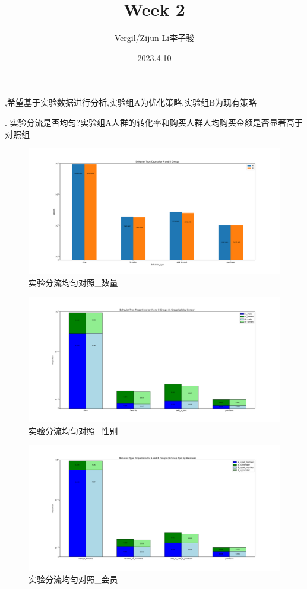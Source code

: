 \documentclass[a4paper]{article}
\author{Vergil/Zijun Li李子骏}
\title{Week 2}
\date{2023.4.10}
\begin{document}
\maketitle
{},希望基于实验数据进行分析,实验组A为优化策略,实验组B为现有策略

.	实验分流是否均匀?实验组A人群的转化率和购买人群人均购买金额是否显著高于对照组

\begin{figure}[H]
    \centering
    \includegraphics[width=1\textwidth]{./AB_Count.pdf}
    \caption{实验分流均匀对照\_数量}
    \label{fig:experiment1}
\end{figure}

\begin{figure}[H]
	\centering
	\includegraphics[width=1\textwidth]{./AB_Gender.pdf}
	\caption{实验分流均匀对照\_性别}
	\label{fig:2}
\end{figure}

\begin{figure}[H]
	\centering
	\includegraphics[width=1\textwidth]{./AB_Member.pdf}
	\caption{实验分流均匀对照\_会员}
	\label{fig:3}
\end{figure}
\end{document}
